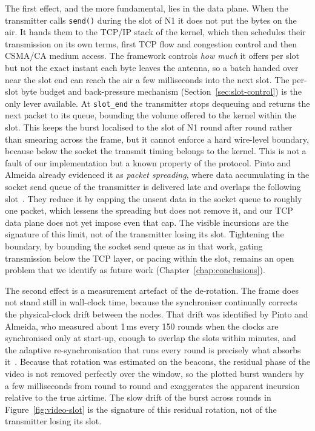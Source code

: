 The first effect, and the more fundamental, lies in the data plane. When the
transmitter calls \texttt{send()} during the slot of N1 it does not put the bytes on
the air. It hands them to the TCP/IP stack of the kernel, which then schedules their
transmission on its own terms, first TCP flow and congestion control and then
CSMA/CA medium access. The framework controls \emph{how much} it offers per slot
but not the exact instant each byte leaves the antenna, so a batch handed over
near the slot end can reach the air a few milliseconds into the next slot. The
per-slot byte budget and back-pressure mechanism (Section~\ref{sec:slot-control})
is the only lever available. At \texttt{slot\_end} the transmitter stops
dequeuing and returns the next packet to its queue, bounding the volume offered
to the kernel within the slot. This keeps the burst localised to the slot of N1 round
after round rather than smearing across the frame, but it cannot enforce a hard
wire-level boundary, because below the socket the transmit timing belongs to the
kernel. This is not a fault of our implementation but a known property of the
protocol. Pinto and Almeida already evidenced it as \emph{packet spreading},
where data accumulating in the socket send queue of the transmitter is delivered late
and overlaps the following slot~\cite{pinto2018robust, ramos2018aerial}. They
reduce it by capping the unsent data in the socket queue to roughly one packet,
which lessens the spreading but does not remove it, and our TCP data plane does
not yet impose even that cap. The visible incursions are the signature of this
limit, not of the transmitter losing its slot. Tightening the boundary, by
bounding the socket send queue as in that work, gating transmission below the
TCP layer, or pacing within the slot, remains an open problem that we identify
as future work (Chapter~\ref{chap:conclusions}).

The second effect is a measurement artefact of the de-rotation. The frame does
not stand still in wall-clock time, because the synchroniser continually
corrects the physical-clock drift between the nodes. That drift was identified by
Pinto and Almeida, who measured about 1\,ms every 150 rounds when the clocks are
synchronised only at start-up, enough to overlap the slots within minutes, and
the adaptive re-synchronisation that runs every round is precisely what absorbs
it~\cite{pinto2018robust, ramos2018aerial}. Because that rotation was estimated
on the beacons, the residual phase of the video is not removed perfectly over the
window, so the plotted burst wanders by a few milliseconds from round to round
and exaggerates the apparent incursion relative to the true airtime. The slow
drift of the burst across rounds in Figure~\ref{fig:video-slot} is the signature
of this residual rotation, not of the transmitter losing its slot.

